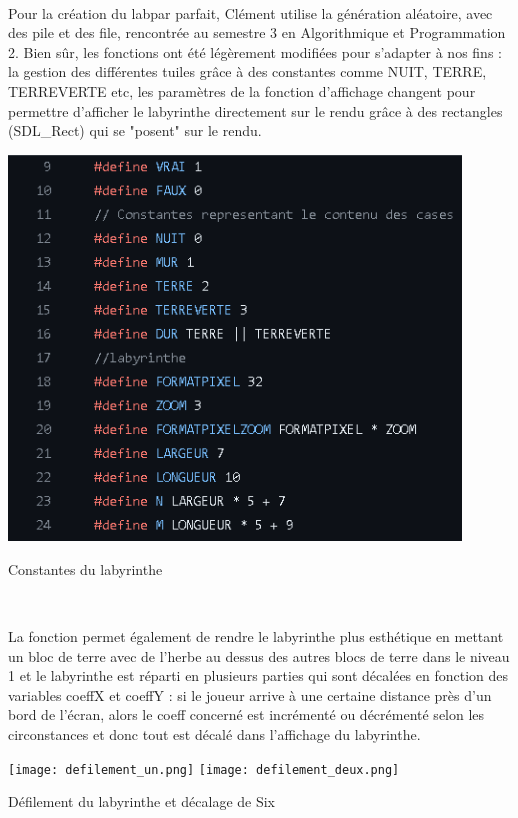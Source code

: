 \documentclass[10pt]{article}
\begin{document}
    \\

   Pour la création du \gls{labpar} parfait, Clément utilise la génération aléatoire, avec des \gls{pile} et des \gls{file}, rencontrée au semestre 3 en Algorithmique et Programmation 2.
   Bien sûr, les fonctions ont été légèrement modifiées pour s'adapter à nos fins : la gestion des différentes tuiles grâce à des \gls{constantes} comme NUIT, TERRE, TERREVERTE etc, les paramètres de la fonction d'affichage changent pour permettre d'afficher le labyrinthe directement sur le \gls{rendu} grâce à des rectangles (SDL\_Rect) qui se "posent" sur le rendu. 
   \\
    \begin{center}
        \centering
        \includegraphics[width=12cm]{lab_h.png}
        \caption{Constantes du labyrinthe}
        \label{fig11}\\
    \end{center}
   La fonction permet également de rendre le labyrinthe plus esthétique en mettant un bloc de terre avec de l'herbe au dessus des autres blocs de terre dans le niveau 1 et le labyrinthe est réparti en plusieurs parties qui sont décalées en fonction des variables coeffX et coeffY : si le joueur arrive à une certaine distance près d'un bord de l'écran, alors le coeff concerné est incrémenté ou décrémenté selon les circonstances et donc tout est décalé dans l'affichage du labyrinthe.\\
   \begin{center}
        \centering
        \texttt{[image: defilement\_un.png]}
        \texttt{[image: defilement\_deux.png]}
        \caption{Défilement du labyrinthe et décalage de Six}
        \label{fig12}\\
    \end{center}
   
\end{document}
